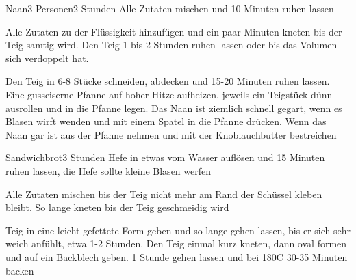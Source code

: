 

\begin{recipe}{Naan}{3 Personen}{2 Stunden}
Alle Zutaten mischen und 10 Minuten ruhen lassen

Alle Zutaten zu der Flüssigkeit hinzufügen und ein paar Minuten kneten bis der Teig samtig wird. Den Teig 1 bis 2 Stunden ruhen lassen oder bis das Volumen sich verdoppelt hat.

Den Teig in 6-8 Stücke schneiden, abdecken und 15-20 Minuten ruhen lassen.
Eine gusseiserne Pfanne auf hoher Hitze aufheizen, jeweils ein Teigstück dünn ausrollen und in die Pfanne legen.
Das Naan ist ziemlich schnell gegart, wenn es Blasen wirft wenden und mit einem Spatel in die Pfanne drücken.
Wenn das Naan gar ist aus der Pfanne nehmen und mit der Knoblauchbutter bestreichen
\end{recipe}



\begin{recipe}{Sandwichbrot}{}{3 Stunden}
Hefe in etwas vom Wasser auflösen und 15 Minuten ruhen lassen, die Hefe sollte kleine Blasen werfen

Alle Zutaten mischen bis der Teig nicht mehr am Rand der Schüssel kleben bleibt. So lange kneten bis der Teig geschmeidig wird

\ing[]{}{}
Teig in eine leicht gefettete Form geben und so lange gehen lassen, bis er sich sehr weich anfühlt, etwa 1-2 Stunden. Den Teig einmal kurz kneten, dann oval formen und auf ein Backblech geben.
1 Stunde gehen lassen und bei 180\0C 30-35 Minuten backen
\end{recipe}



